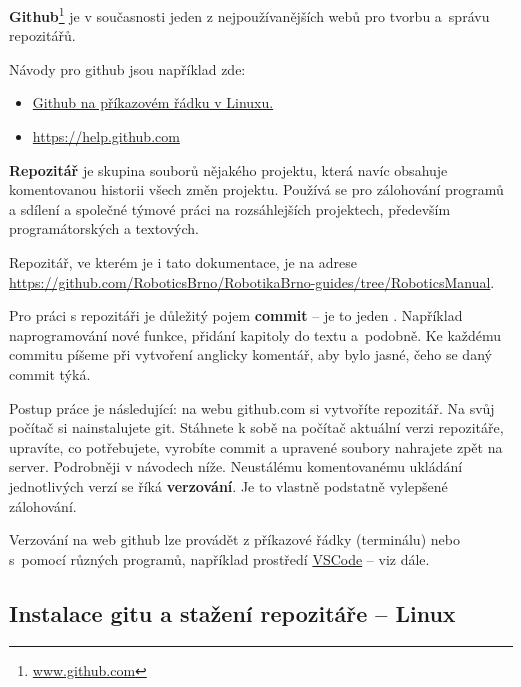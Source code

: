 {\bf Github}\footnote{\url{www.github.com}}  je v současnosti jeden z nejpoužívanějších webů pro tvorbu a~správu repozitářů.

Návody pro github jsou například zde: 

\begin{itemize}
	\item \href{http://www.kutac.cz/blog/pocitace-a-internety/jak-na-git-dil-1/}{Github na příkazovém řádku v Linuxu.}
	\item \url{https://help.github.com}
	
\end{itemize}

 

{\bf Repozitář}  je skupina souborů nějakého projektu, která navíc obsahuje komentovanou historii všech změn projektu. Používá se pro zálohování programů a sdílení a společné týmové práci na rozsáhlejších projektech, především programátorských a textových. 
 
Repozitář, ve kterém je i tato dokumentace, je na adrese 
 \url{https://github.com/RoboticsBrno/RobotikaBrno-guides/tree/RoboticsManual}.   

Pro práci s repozitáři je důležitý pojem {\bf commit}  -- je to jeden . 
Například naprogramování  nové funkce, přidání kapitoly do textu a~podobně. 
Ke každému commitu píšeme při vytvoření anglicky komentář, aby bylo jasné, čeho se daný commit týká.

Postup práce je následující: na webu github.com si vytvoříte repozitář. Na svůj počítač si nainstalujete git. Stáhnete k sobě na počítač aktuální verzi repozitáře, upravíte, co potřebujete, vyrobíte commit a upravené soubory nahrajete zpět na server. Podrobněji v návodech níže. 
Neustálému komentovanému ukládání jednotlivých verzí se říká {\bf verzování}. Je to vlastně podstatně vylepšené zálohování.

Verzování na web github lze provádět z příkazové řádky (terminálu) nebo s~pomocí různých programů, například prostředí \hyperref[vscode]{VSCode} -- viz dále. 



\subsection{Instalace gitu a stažení repozitáře -- Linux} \label{instal_github}


